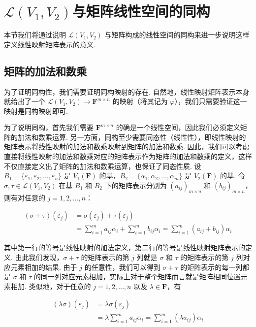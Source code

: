\section{$\mathcal{L}(V_1,V_2)$与矩阵线性空间的同构}

本节我们将通过说明 $\mathcal{L}(V_1,V_2)$ 与矩阵构成的线性空间的同构来进一步说明这样定义线性映射矩阵表示的意义.

\subsection{矩阵的加法和数乘}

为了证明同构性，我们需要证明同构映射的存在. 自然地，线性映射矩阵表示本身就给出了一个 $\mathcal{L}(V_1,V_2) \to \mathbf{F}^{m \times n}$ 的映射（将其记为 $\varphi$），我们只需要验证这一映射是同构映射即可.

为了说明同构，首先我们需要 $\mathbf{F}^{m \times n}$ 的确是一个线性空间，因此我们必须定义矩阵的加法和数乘运算. 另一方面，同构至少需要同态性（线性性），即线性映射的矩阵表示将线性映射的加法和数乘映射到矩阵的加法和数乘. 因此，我们可以考虑直接将线性映射的加法和数乘对应的矩阵表示作为矩阵的加法和数乘的定义，这样不仅直接定义出了矩阵的加法和数乘运算，也保证了同态性质. 设 $B_1 = \{\varepsilon_1,\varepsilon_2,\ldots,\varepsilon_n\}$ 是 $V_1(\mathbf{F})$ 的基，$B_2 = \{\alpha_1,\alpha_2,\ldots,\alpha_m\}$ 是 $V_2(\mathbf{F})$ 的基. 令 $\sigma, \tau \in \mathcal{L}(V_1,V_2)$ 在基 $B_1$ 和 $B_2$ 下的矩阵表示分别为 $(a_{ij})_{m \times n}$ 和 $(b_{ij})_{m \times n}$，则有对任意的 $j = 1, 2, \ldots, n$：

\begin{align*}
    (\sigma + \tau)(\varepsilon_j) & = \sigma(\varepsilon_j) + \tau(\varepsilon_j) \\
    &= \sum_{i=1}^m a_{ij}\alpha_i + \sum_{i=1}^m b_{ij}\alpha_i = \sum_{i=1}^m (a_{ij} + b_{ij})\alpha_i
\end{align*}

其中第一行的等号是线性映射的加法定义，第二行的等号是线性映射矩阵表示的定义. 由此我们发现，$\sigma + \tau$ 的矩阵表示的第 $j$ 列就是 $\sigma$ 和 $\tau$ 的矩阵表示的第 $j$ 列对应元素相加的结果. 由于 $j$ 的任意性，我们可以得到 $\sigma + \tau$ 的矩阵表示的每一列都是 $\sigma$ 和 $\tau$ 的同一列对应元素相加，实际上对于整个矩阵而言就是矩阵相同位置元素相加. 类似地，对于任意的 $j = 1, 2, \ldots, n$ 以及 $\lambda \in \mathbf{F}$，有

\begin{align*}
    (\lambda \sigma)(\varepsilon_j) & = \lambda \sigma(\varepsilon_j) \\
    &= \lambda \sum_{i=1}^m a_{ij}\alpha_i = \sum_{i=1}^m (\lambda a_{ij})\alpha_i
\end{align*}


